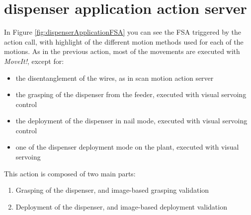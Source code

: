 \section{dispenser application action server}\label{sec:dispenserApplicationImplementation}

In Figure \ref{fig:dispenserApplicationFSA} you can see the \ac{FSA} triggered by the action call, with highlight of the different motion methods used for each of the motions. As in the previous action, most of the movements are executed with \textit{MoveIt!}, except for:
\begin{itemize}
	\item the disentanglement of the wires, as in scan motion action server
	\item the grasping of the dispenser from the feeder, executed with visual servoing control
	\item the deployment of the dispenser in nail mode, executed with visual servoing control
	\item one of the dispenser deployment mode on the plant, executed with visual servoing
\end{itemize}
This action is composed of two main parts:
\begin{enumerate}
	\item Grasping of the dispenser, and image-based grasping validation
	\item Deployment of the dispenser, and image-based deployment validation
\end{enumerate}

